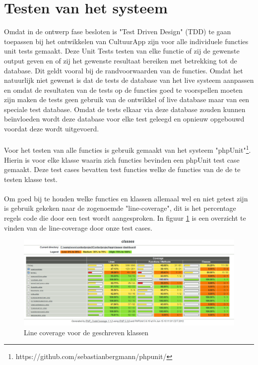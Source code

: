 \documentclass[a4paper,10pt]{article}
\begin{document}
\section{Testen van het systeem}
Omdat in de ontwerp fase besloten is "Test Driven Design" (TDD) te gaan toepassen bij het ont\-wikkelen van CultuurApp zijn voor alle individuele functies unit tests gemaakt. Deze Unit Tests testen van elke functie of zij de gewenste output geven en of zij het gewenste resultaat bereiken met betrekking tot de database. Dit geldt vooral bij de randvoorwaarden van de functies. Omdat het natuurlijk niet gewenst is dat de tests de database van het live systeem aanpassen en omdat de resultaten van de tests op de functies goed te voorspellen moeten zijn maken de tests geen gebruik van de ontwikkel of live database maar van een speciale test database. Omdat de tests elkaar via deze database zouden kunnen be\"invloeden wordt deze database voor elke test geleegd en opnieuw opgebouwd voordat deze wordt uitgevoerd. \\
\\
Voor het testen van alle functies is gebruik gemaakt van het systeem "phpUnit"\footnote{https://github.com/sebastianbergmann/phpunit/}. Hierin is voor elke klasse waarin zich functies bevinden een phpUnit test case gemaakt. Deze test cases bevatten test functies welke de functies van de de te testen klasse test.\\
\\
Om goed bij te houden welke functies en klassen allemaal wel en niet getest zijn is gebruik gekeken naar de zogenoemde "line-coverage", dit is het percentage regels code die door een test wordt aangesproken. In figuur \ref{classes} is een overzicht te vinden van de line-coverage door onze test cases.\\
\begin{figure}[ht!]
	\centering
	\includegraphics[width=\textwidth]{classes.png}
	\caption{Line coverage voor de geschreven klassen \label{classes}}
\end{figure}
\end{document}
